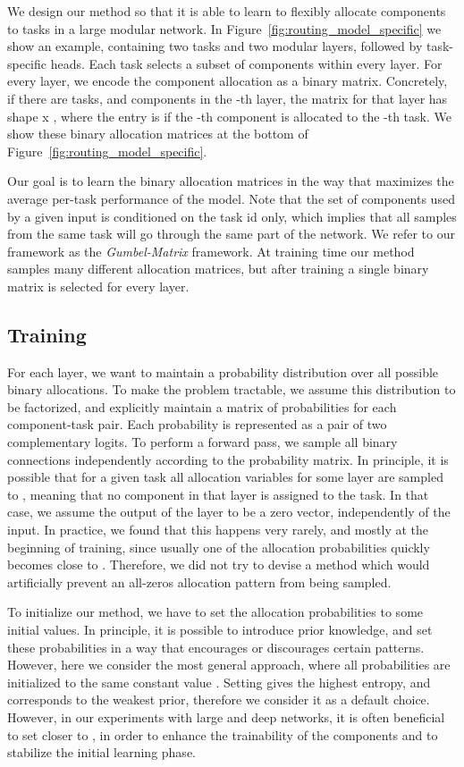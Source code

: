 \documentclass[conference]{IEEEtran}
\begin{document}
We design our method so that it is able to learn to flexibly allocate components to tasks in a large modular network. In Figure~\ref{fig:routing_model_specific} we show an example, containing two tasks and two modular layers, followed by task-specific heads. Each task selects a subset of components within every layer. For every layer, we encode the component allocation as a binary matrix. Concretely, if there are  tasks, and  components in the -th layer, the matrix for that layer has shape  x , where the  entry is  if the -th component is allocated to the -th task. We show these binary allocation matrices at the bottom of Figure~\ref{fig:routing_model_specific}.

Our goal is to learn the binary allocation matrices in the way that maximizes the average per-task performance of the model.
Note that the set of components used by a given input is conditioned on the task id only, which implies that all samples from the same task will go through the same part of the network. We refer to our framework as the \textit{Gumbel-Matrix} framework.
At training time our method samples many different allocation matrices, but after training a single binary matrix is selected for every layer.

\subsection{Training}

For each layer, we want to maintain a probability distribution over all possible binary allocations. To make the problem tractable, we assume this distribution to be factorized, and explicitly maintain a matrix of probabilities for each component-task pair. Each probability is represented as a pair of two complementary logits. To perform a forward pass, we sample all binary connections independently according to the probability matrix. In principle, it is possible that for a given task all allocation variables for some layer are sampled to , meaning that no component in that layer is assigned to the task. In that case, we assume the output of the layer to be a zero vector, independently of the input. In practice, we found that this happens very rarely, and mostly at the beginning of training, since usually one of the allocation probabilities quickly becomes close to . Therefore, we did not try to devise a method which would artificially prevent an all-zeros allocation pattern from being sampled.

To initialize our method, we have to set the allocation probabilities to some initial values. In principle, it is possible to introduce prior knowledge, and set these probabilities in a way that encourages or discourages certain patterns. However, here we consider the most general approach, where all probabilities are initialized to the same constant value . Setting  gives the highest entropy, and corresponds to the weakest prior, therefore we consider it as a default choice. However, in our experiments with large and deep networks, it is often beneficial to set  closer to , in order to enhance the trainability of the components and to stabilize the initial learning phase.
\end{document}
